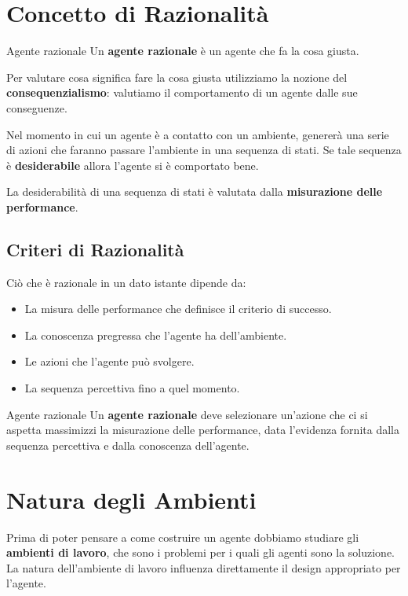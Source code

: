 \section{Concetto di Razionalità}

\begin{definition-box}{Agente razionale}
Un \textbf{agente razionale} è un agente che fa la cosa giusta.
\end{definition-box}

Per valutare cosa significa fare la cosa giusta utilizziamo la nozione del
\textbf{consequenzialismo}: valutiamo il comportamento di un agente dalle sue
conseguenze.

Nel momento in cui un agente è a contatto con un ambiente, genererà una serie
di azioni che faranno passare l'ambiente in una sequenza di stati. Se tale
sequenza è \textbf{desiderabile} allora l'agente si è comportato bene.

La desiderabilità di una sequenza di stati è valutata dalla
\textbf{misurazione delle performance}.

\subsection{Criteri di Razionalità}

Ciò che è razionale in un dato istante dipende da:

\begin{itemize}
	\item La misura delle performance che definisce il criterio di successo.
	\item La conoscenza pregressa che l'agente ha dell'ambiente.
	\item Le azioni che l'agente può svolgere.
	\item La sequenza percettiva fino a quel momento.
\end{itemize}

\begin{definition-box}{Agente razionale}
Un \textbf{agente razionale} deve selezionare un'azione che ci si aspetta
massimizzi la misurazione delle performance, data l'evidenza fornita dalla
sequenza percettiva e dalla conoscenza dell'agente.
\end{definition-box}

\section{Natura degli Ambienti}

Prima di poter pensare a come costruire un agente dobbiamo studiare gli
\textbf{ambienti di lavoro}, che sono i problemi per i quali gli agenti sono la
soluzione. La natura dell'ambiente di lavoro influenza direttamente il design
appropriato per l'agente.


